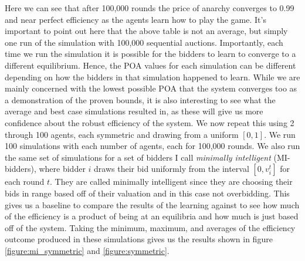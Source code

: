 \documentclass[12pt,twoside]{reedthesis}
\begin{document}
Here we can see that after 100,000 rounds the price of anarchy converges to 0.99 and near perfect efficiency as the agents learn how to play the game. It's important to point out here that the above table is not an average, but simply one run of the simulation with 100,000 sequential auctions. Importantly, each time we run the simulation it is possible for the bidders to learn to converge to a different equilibrium. Hence, the POA values for each simulation can be different depending on how the bidders in that simulation happened to learn. While we are mainly concerned with the lowest possible POA that the system converges too as a demonstration of the proven bounds, it is also interesting to see what the average and best case simulations resulted in, as these will give us more confidence about the robust efficiency of the system. We now repeat this using 2 through 100 agents, each symmetric and drawing from a uniform $[0,1]$. We run 100 simulations with each number of agents, each for 100,000 rounds. We also run the same set of simulations for a set of bidders I call {\em minimally intelligent} (MI-bidders), where bidder $i$ draws their bid uniformly from the interval $[0,v_i^t]$ for each round $t$. They are called minimally intelligent since they are choosing their bids in range based off of their valuation and in this case not overbidding. This gives us a baseline to compare the results of the learning against to see how much of the efficiency is a product of being at an equilibria and how much is just based off of the system. Taking the minimum, maximum, and averages of the efficiency outcome produced in these simulations gives us the results shown in figure \ref{figure:mi_symmetric} and \ref{figure:symmetric}. 
\end{document}
